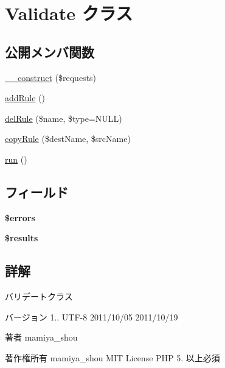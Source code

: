 \hypertarget{class_validate}{\section{Validate クラス}
\label{class_validate}
}
\subsection*{公開メンバ関数}
\begin{DoxyCompactItemize}
\item 
\hyperlink{class_validate_affd2166b9ae24d7f6d972b6e8e27ab64}{\+\_\+\+\_\+construct} (\$requests)
\item 
\hyperlink{class_validate_a0f28658da9689c7abbfeef6620621b11}{add\+Rule} ()
\item 
\hyperlink{class_validate_a3784964295510f2bf9e3c08945073a6e}{del\+Rule} (\$name, \$type=N\+U\+L\+L)
\item 
\hyperlink{class_validate_afc81a53f0add88b49c6f84068d47987b}{copy\+Rule} (\$dest\+Name, \$src\+Name)
\item 
\hyperlink{class_validate_afb0fafe7e02a3ae1993c01c19fad2bae}{run} ()
\end{DoxyCompactItemize}
\subsection*{フィールド}
\begin{DoxyCompactItemize}
\item 
\hypertarget{class_validate_ab24faf4aa647cdcee494fc48524ad4ff}{{\bfseries \$errors}}\label{class_validate_ab24faf4aa647cdcee494fc48524ad4ff}

\item 
\hypertarget{class_validate_a233d12bd8b6d3453e9a7a3f0b8c31db2}{{\bfseries \$results}}\label{class_validate_a233d12bd8b6d3453e9a7a3f0b8c31db2}

\end{DoxyCompactItemize}


\subsection{詳解}
バリデートクラス

\begin{DoxyVersion}{バージョン}
1..  U\+T\+F-\/8  2011/10/05  2011/10/19 
\end{DoxyVersion}
\begin{DoxyAuthor}{著者}
mamiya\+\_\+shou 
\end{DoxyAuthor}
\begin{DoxyCopyright}{著作権所有}
mamiya\+\_\+shou  M\+I\+T License  P\+H\+P 5. 以上必須 
\end{DoxyCopyright}


